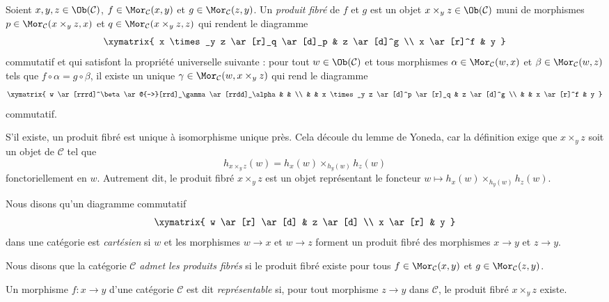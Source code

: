 \begin{definition}
\label{definition-fibre-products}
Soient $x, y, z\in \Ob(\mathcal{C})$,
$f\in \Mor_\mathcal{C}(x, y)$
et $g\in \Mor_{\mathcal C}(z, y)$.
Un {\it produit fibré} de $f$ et $g$ est
un objet $x \times_y z\in \Ob(\mathcal{C})$
muni de morphismes
$p \in \Mor_{\mathcal C}(x \times_y z, x)$ et
$q \in \Mor_{\mathcal C}(x \times_y z, z)$ qui rendent le diagramme
$$
\xymatrix{
x \times_y z \ar[r]_q \ar[d]_p & z \ar[d]^g \\
x \ar[r]^f & y
}
$$
commutatif et qui satisfont la propriété universelle suivante : pour tout
$w\in \Ob(\mathcal{C})$ et tous morphismes
$\alpha \in \Mor_{\mathcal C}(w, x)$ et
$\beta \in \Mor_\mathcal{C}(w, z)$ tels que
$f \circ \alpha = g \circ \beta$,
il existe un unique
$\gamma \in \Mor_{\mathcal C}(w, x \times_y z)$ qui rend le diagramme
$$
\xymatrix{
w \ar[rrrd]^\beta \ar@{-->}[rrd]_\gamma \ar[rrdd]_\alpha & & \\
& & x \times_y z \ar[d]^p \ar[r]_q & z \ar[d]^g \\
& & x \ar[r]^f & y
}
$$
commutatif.
\end{definition}

\noindent
S'il existe, un produit fibré est unique à isomorphisme unique près.
Cela découle du lemme de Yoneda, car la définition exige que
$x \times_y z$ soit un objet de $\mathcal{C}$ tel que
$$
h_{x \times_y z}(w) = h_x(w) \times_{h_y(w)} h_z(w)
$$
fonctoriellement en $w$. Autrement dit, le produit fibré $x \times_y z$
est un objet représentant le foncteur
$w \mapsto h_x(w) \times_{h_y(w)} h_z(w)$.

\begin{definition}
\label{definition-cartesian}
Nous disons qu'un diagramme commutatif
$$
\xymatrix{
w \ar[r] \ar[d] &
z \ar[d] \\
x \ar[r] &
y
}
$$
dans une catégorie est {\it cartésien} si $w$ et les morphismes
$w \to x$ et $w \to z$ forment un produit fibré des morphismes
$x \to y$ et $z \to y$.
\end{definition}

\begin{definition}
\label{definition-has-fibre-products}
Nous disons que la catégorie $\mathcal{C}$ {\it admet les produits fibrés}
si le produit fibré existe pour tous
$f\in \Mor_{\mathcal C}(x, y)$ et
$g\in \Mor_{\mathcal C}(z, y)$.
\end{definition}

\begin{definition}
\label{definition-representable-morphism}
Un morphisme $f : x \to y$ d'une catégorie $\mathcal{C}$ est dit
{\it représentable} si, pour tout morphisme $z \to y$
dans $\mathcal{C}$, le produit fibré $x \times_y z$ existe.
\end{definition}

